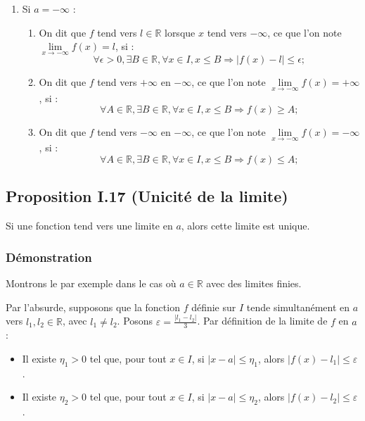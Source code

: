 \documentclass{article}
\begin{document}
\begin{enumerate}
			\item Si $a = -\infty$ :
			\begin{enumerate}
				\item On dit que $f$ tend vers $l \in \mathbb{R}$ lorsque $x$ tend vers $-\infty$, ce que l’on note $\lim\limits_{x \to -\infty} f(x) = l$, si :
				\[
				\forall \epsilon > 0, \exists B \in \mathbb{R}, \forall x \in I, x \leq B \Rightarrow |f(x) - l| \leq \epsilon;
				\]
				\item On dit que $f$ tend vers $+\infty$ en $-\infty$, ce que l’on note $\lim\limits_{x \to -\infty} f(x) = +\infty$, si :
				\[
				\forall A \in \mathbb{R}, \exists B \in \mathbb{R}, \forall x \in I, x \leq B \Rightarrow f(x) \geq A;
				\]
				\item On dit que $f$ tend vers $-\infty$ en $-\infty$, ce que l’on note $\lim\limits_{x \to -\infty} f(x) = -\infty$, si :
				\[
				\forall A \in \mathbb{R}, \exists B \in \mathbb{R}, \forall x \in I, x \leq B \Rightarrow f(x) \leq A;
				\]
			\end{enumerate}
		\end{enumerate}
	\subsection{Proposition I.17 (Unicité de la limite)}
	
	Si une fonction tend vers une limite en $a$, alors cette limite est unique.
	
	\subsubsection*{Démonstration}
	
	Montrons le par exemple dans le cas où $a \in \mathbb{R}$ avec des limites finies.
	
	Par l'absurde, supposons que la fonction $f$ définie sur $I$ tende simultanément en $a$ vers $l_1, l_2 \in \mathbb{R}$, avec $l_1 \neq l_2$. Posons $\varepsilon = \frac{|l_1 - l_2|}{3}$. Par définition de la limite de $f$ en $a$ :
	
	\begin{itemize}
		\item Il existe $\eta_1 > 0$ tel que, pour tout $x \in I$, si $|x - a| \leq \eta_1$, alors $|f(x) - l_1| \leq \varepsilon$.
		\item Il existe $\eta_2 > 0$ tel que, pour tout $x \in I$, si $|x - a| \leq \eta_2$, alors $|f(x) - l_2| \leq \varepsilon$.
	\end{itemize}
	
\end{document}
